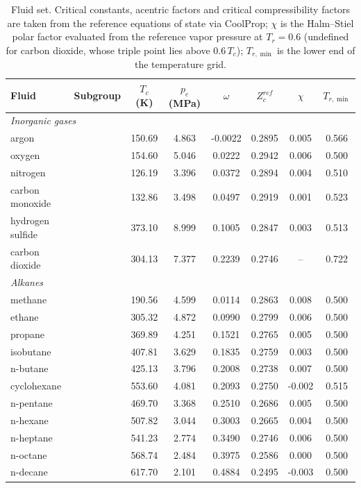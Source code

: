 \begin{table}[H]
\centering
\caption{Fluid set. Critical constants, acentric factors and critical compressibility factors are taken from the reference equations of state via CoolProp; $\chi$ is the Halm--Stiel polar factor evaluated from the reference vapor pressure at $T_r = 0.6$ (undefined for carbon dioxide, whose triple point lies above $0.6\,T_c$); $T_{r,\min}$ is the lower end of the temperature grid.}
\label{tab:tabS_fluids}
\small
\begin{tabular}{llcccccc}
\toprule
Fluid & Subgroup & $T_c$ (K) & $p_c$ (MPa) & $\omega$ & $Z_c^{ref}$ & $\chi$ & $T_{r,\min}$ \\
\midrule
\multicolumn{8}{l}{\emph{Inorganic gases}} \\
argon &  & 150.69 & 4.863 & -0.0022 & 0.2895 & 0.005 & 0.566 \\
oxygen &  & 154.60 & 5.046 & 0.0222 & 0.2942 & 0.006 & 0.500 \\
nitrogen &  & 126.19 & 3.396 & 0.0372 & 0.2894 & 0.004 & 0.510 \\
carbon monoxide &  & 132.86 & 3.498 & 0.0497 & 0.2919 & 0.001 & 0.523 \\
hydrogen sulfide &  & 373.10 & 8.999 & 0.1005 & 0.2847 & 0.003 & 0.513 \\
carbon dioxide &  & 304.13 & 7.377 & 0.2239 & 0.2746 & -- & 0.722 \\
\multicolumn{8}{l}{\emph{Alkanes}} \\
methane &  & 190.56 & 4.599 & 0.0114 & 0.2863 & 0.008 & 0.500 \\
ethane &  & 305.32 & 4.872 & 0.0990 & 0.2799 & 0.006 & 0.500 \\
propane &  & 369.89 & 4.251 & 0.1521 & 0.2765 & 0.005 & 0.500 \\
isobutane &  & 407.81 & 3.629 & 0.1835 & 0.2759 & 0.003 & 0.500 \\
n-butane &  & 425.13 & 3.796 & 0.2008 & 0.2738 & 0.007 & 0.500 \\
cyclohexane &  & 553.60 & 4.081 & 0.2093 & 0.2750 & -0.002 & 0.515 \\
n-pentane &  & 469.70 & 3.368 & 0.2510 & 0.2686 & 0.005 & 0.500 \\
n-hexane &  & 507.82 & 3.044 & 0.3003 & 0.2665 & 0.004 & 0.500 \\
n-heptane &  & 541.23 & 2.774 & 0.3490 & 0.2746 & 0.006 & 0.500 \\
n-octane &  & 568.74 & 2.484 & 0.3975 & 0.2586 & 0.000 & 0.500 \\
n-decane &  & 617.70 & 2.101 & 0.4884 & 0.2495 & -0.003 & 0.500 \\

\end{tabular}
\end{table}
